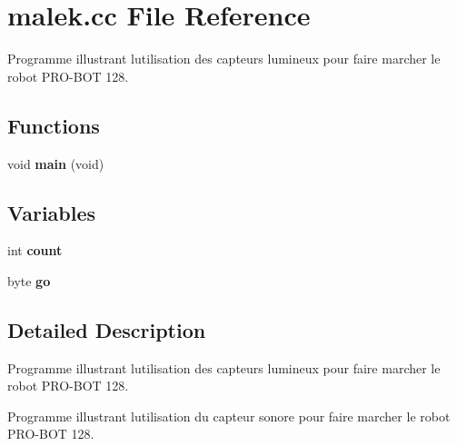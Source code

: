 \section{malek.\+cc File Reference}
\label{malek_8cc}


Programme illustrant l\textquotesingle{}utilisation des capteurs lumineux pour faire marcher le robot P\+R\+O-\/\+B\+OT 128.  


\subsection*{Functions}
\begin{DoxyCompactItemize}
\item 
void {\bf main} (void)
\end{DoxyCompactItemize}
\subsection*{Variables}
\begin{DoxyCompactItemize}
\item 
int {\bf count}
\item 
byte {\bf go}
\end{DoxyCompactItemize}


\subsection{Detailed Description}
Programme illustrant l\textquotesingle{}utilisation des capteurs lumineux pour faire marcher le robot P\+R\+O-\/\+B\+OT 128. 

Programme illustrant l\textquotesingle{}utilisation du capteur sonore pour faire marcher le robot P\+R\+O-\/\+B\+OT 128.

